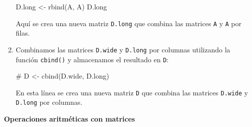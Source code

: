 \documentclass[
  jou,
  floatsintext,
  longtable,
  a4paper,
  nolmodern,
  notxfonts,
  notimes,
  colorlinks=true,linkcolor=blue,citecolor=blue,urlcolor=blue]{apa7}
\newenvironment{Shaded}{\begin{snugshade}}{\end{snugshade}}
\newcommand{\CommentTok}[1]{\textcolor[rgb]{0.37,0.37,0.37}{#1}}
\newcommand{\FunctionTok}[1]{\textcolor[rgb]{0.28,0.35,0.67}{#1}}
\newcommand{\NormalTok}[1]{\textcolor[rgb]{0.00,0.23,0.31}{#1}}
\newcommand{\OtherTok}[1]{\textcolor[rgb]{0.00,0.23,0.31}{#1}}
\begin{document}
\begin{enumerate}
\begin{Shaded}
\begin{Highlighting}[]
\NormalTok{D.long }\OtherTok{\textless{}{-}} \FunctionTok{rbind}\NormalTok{(A, A)}
\NormalTok{D.long}
\end{Highlighting}
\end{Shaded}

  Aquí se crea una nueva matriz \texttt{D.long} que combina las matrices
  \texttt{A} y \texttt{A} por filas.
\item
  Combinamos las matrices \texttt{D.wide} y \texttt{D.long} por columnas
  utilizando la función \texttt{cbind()} y almacenamos el resultado en
  \texttt{D}:

\begin{Shaded}
\begin{Highlighting}[]
\CommentTok{\# D \textless{}{-} cbind(D.wide, D.long)}
\end{Highlighting}
\end{Shaded}

  En esta línea se crea una nueva matriz \texttt{D} que combina las
  matrices \texttt{D.wide} y \texttt{D.long} por columnas.
\end{enumerate}

\textbf{Operaciones aritméticas con matrices}
\end{document}
